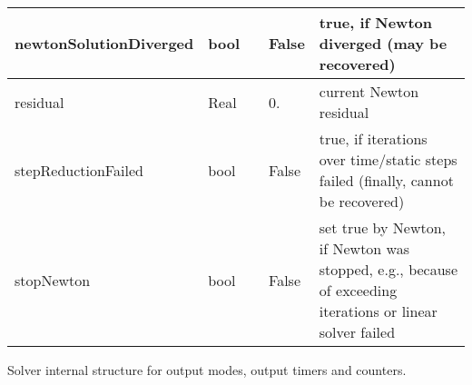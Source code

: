 \begin{center}
\begin{longtable}{| p{4.2cm} | p{2.5cm} | p{0.3cm} | p{3.0cm} | p{6cm} |}
    newtonSolutionDiverged &     bool &      &     False &     true, if Newton diverged (may be recovered)\\ \hline
    residual &     Real &      &     0. &     current Newton residual\\ \hline
    stepReductionFailed &     bool &      &     False &     true, if iterations over time/static steps failed (finally, cannot be recovered)\\ \hline
    stopNewton &     bool &      &     False &     set true by Newton, if Newton was stopped, e.g., because of exceeding iterations or linear solver failed\\ \hline
	  \end{longtable}
	\end{center}



\label{sec:SolverOutputData}
Solver internal structure for output modes, output timers and counters.

